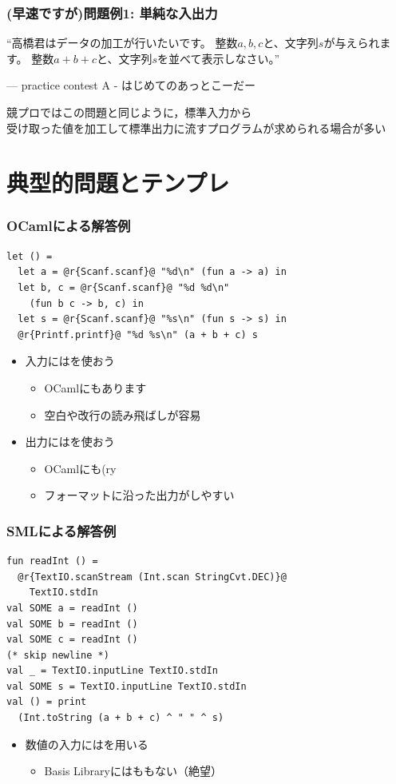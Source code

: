 \documentclass[dvipdfmx,cjk,xcolor=dvipsnames,envcountsect,notheorems,12pt]{beamer}
\theoremstyle{definition}
\begin{document}
\begin{frame}
	\frametitle{(早速ですが)問題例1: 単純な入出力}
	\begin{block}{}
		{\Large ``高橋君はデータの加工が行いたいです。
		整数$a,b,c$と、文字列$s$が与えられます。
		整数$a+b+c$と、文字列$s$を並べて表示しなさい。''}
		\begin{flushright}
			--- practice contest A - はじめてのあっとこーだー
		\end{flushright}
	\end{block}
	\vfill
	{\large 競プロではこの問題と同じように，標準入力から\\受け取った値を加工して標準出力に流すプログラムが求められる場合が多い}
\end{frame}

\section{典型的問題とテンプレ}

\begin{frame}[fragile]
	\frametitle{OCamlによる解答例}
	\begin{lstlisting}
let () =
  let a = @r{Scanf.scanf}@ "%d\n" (fun a -> a) in
  let b, c = @r{Scanf.scanf}@ "%d %d\n"
    (fun b c -> b, c) in
  let s = @r{Scanf.scanf}@ "%s\n" (fun s -> s) in
  @r{Printf.printf}@ "%d %s\n" (a + b + c) s
	\end{lstlisting}
	\begin{itemize}
		\item 入力にはを使おう
			\begin{itemize}
				\item OCamlにもあります
				\item 空白や改行の読み飛ばしが容易
			\end{itemize}
		\item 出力にはを使おう
			\begin{itemize}
				\item OCamlにも(ry
				\item フォーマットに沿った出力がしやすい
			\end{itemize}
	\end{itemize}
\end{frame}

\begin{frame}[fragile]
	\frametitle{SMLによる解答例}
	\begin{lstlisting}
fun readInt () =
  @r{TextIO.scanStream (Int.scan StringCvt.DEC)}@
    TextIO.stdIn
val SOME a = readInt ()
val SOME b = readInt ()
val SOME c = readInt ()
(* skip newline *)
val _ = TextIO.inputLine TextIO.stdIn
val SOME s = TextIO.inputLine TextIO.stdIn
val () = print
  (Int.toString (a + b + c) ^ " " ^ s)
	\end{lstlisting}
	\begin{itemize}
		\item 数値の入力にはを用いる
			\begin{itemize}
				\item Basis Libraryにはももない（絶望）
			\end{itemize}
	\end{itemize}
\end{frame}
\end{document}
